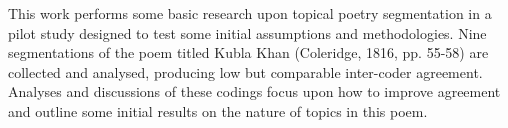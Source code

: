 This work performs some basic research upon topical poetry segmentation in a pilot study designed to test some initial assumptions and methodologies. Nine
 segmentations of the poem titled Kubla Khan (Coleridge, 1816, pp. 55-58) are
 collected and analysed, producing low but comparable inter-coder agreement.
 Analyses and discussions of these codings focus upon how to improve agreement
 and outline some initial results on the nature of topics in this poem.


